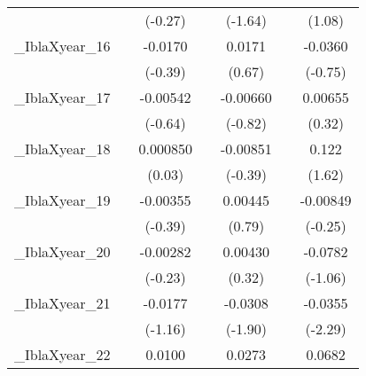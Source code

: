 {\begin{tabular}{l*{6}{c}}
            &                     &     (-0.27)         &                     &     (-1.64)         &                     &      (1.08)         \\
[1em]
\_IblaXyear\_16&                     &     -0.0170         &                     &      0.0171         &                     &     -0.0360         \\
            &                     &     (-0.39)         &                     &      (0.67)         &                     &     (-0.75)         \\
[1em]
\_IblaXyear\_17&                     &    -0.00542         &                     &    -0.00660         &                     &     0.00655         \\
            &                     &     (-0.64)         &                     &     (-0.82)         &                     &      (0.32)         \\
[1em]
\_IblaXyear\_18&                     &    0.000850         &                     &    -0.00851         &                     &       0.122         \\
            &                     &      (0.03)         &                     &     (-0.39)         &                     &      (1.62)         \\
[1em]
\_IblaXyear\_19&                     &    -0.00355         &                     &     0.00445         &                     &    -0.00849         \\
            &                     &     (-0.39)         &                     &      (0.79)         &                     &     (-0.25)         \\
[1em]
\_IblaXyear\_20&                     &    -0.00282         &                     &     0.00430         &                     &     -0.0782         \\
            &                     &     (-0.23)         &                     &      (0.32)         &                     &     (-1.06)         \\
[1em]
\_IblaXyear\_21&                     &     -0.0177         &                     &     -0.0308         &                     &     -0.0355\sym{*}  \\
            &                     &     (-1.16)         &                     &     (-1.90)         &                     &     (-2.29)         \\
[1em]
\_IblaXyear\_22&                     &      0.0100         &                     &      0.0273         &                     &      0.0682         \\

\end{tabular}}
